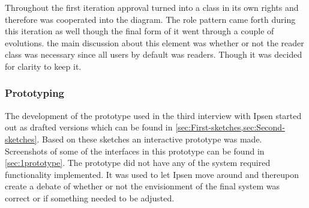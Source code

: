Throughout the first iteration approval turned into a class in its own rights and therefore was cooperated into the diagram.
The role pattern came forth during this iteration as well though the final form of it went through a couple of evolutions.
the main discussion about this element was whether or not the reader class was necessary since all users by default was readers. 
Though it was decided for clarity to keep it.

\subsubsection*{Prototyping}
The development of the prototype used in the third interview with Ipsen started out as drafted versions which can be found in \cref{sec:First-sketches,sec:Second-sketches}.
Based on these sketches an interactive prototype was made. 
Screenshots of some of the interfaces in this prototype can be found in \cref{sec:1prototype}.
The prototype did not have any of the system required functionality implemented.
It was used to let Ipsen move around and thereupon create a debate of whether or not the envisionment of the final system was correct or if something needed to be adjusted.